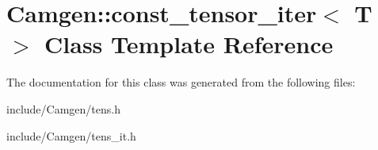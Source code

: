 \hypertarget{a00102}{}\section{Camgen\+:\+:const\+\_\+tensor\+\_\+iter$<$ T $>$ Class Template Reference}
\label{a00102}


The documentation for this class was generated from the following files\+:\begin{DoxyCompactItemize}
\item 
include/\+Camgen/tens.\+h\item 
include/\+Camgen/tens\+\_\+it.\+h\end{DoxyCompactItemize}
